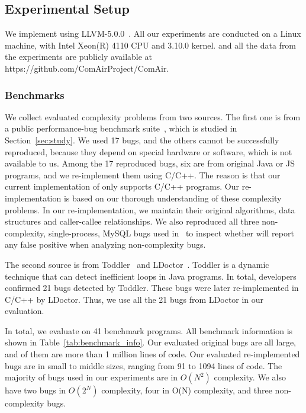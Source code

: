 \subsection{Experimental Setup}

We implement \Tool using LLVM-5.0.0~\cite{llvm}. 
All our experiments are conducted on a Linux machine, 
with Intel Xeon(R) 4110 CPU and 3.10.0 kernel.
\Tool and all the data from the experiments are publicly 
available at https://github.com/ComAirProject/ComAir.





\subsubsection{Benchmarks}

We collect evaluated complexity problems from two sources. 
The first one is
from a public performance-bug benchmark 
suite~\cite{PerfBug,SongOOPSLA2014,ldoctor}, which is
studied in Section~\ref{sec:study}.
We used 17 bugs, and the others cannot be successfully
reproduced, because they depend on special hardware 
or software, which is not available to us. 
Among the 17 reproduced bugs, six are from
original Java or JS programs, 
and we re-implement them using C/C++.
The reason is that our current implementation of \Tool 
only supports C/C++ programs.
Our re-implementation is based on our thorough 
understanding of these complexity problems.
In our re-implementation, we maintain 
their original algorithms, 
data structures and caller-callee relationships. 
We also reproduced all three non-complexity, 
single-process, MySQL bugs used in~\cite{SongOOPSLA2014} 
to inspect whether \Tool will report 
any false positive when analyzing non-complexity bugs.

The second source is from Toddler~\cite{Alabama} and LDoctor~\cite{ldoctor}. 
Toddler is a dynamic technique that can detect inefficient loops in Java programs.
In total, developers confirmed 21 bugs detected by Toddler. 
These bugs were later re-implemented in C/C++ by LDoctor. 
Thus, we use all the 21 bugs from LDoctor in our evaluation.  


In total, we evaluate \Tool on 41 benchmark programs. 
All benchmark information is shown in Table~\ref{tab:benchmark_info}. 
Our evaluated original bugs are all large, and  of them 
are more than 1 million lines of code.
Our evaluated re-implemented bugs are in small to middle sizes, 
ranging from 91 to 1094 lines of code. 
The majority of bugs used in our experiments are in $O(N^2)$ complexity. 
We also have two bugs in $O(2^N)$ complexity, four in O(N) complexity, 
and three non-complexity bugs.


